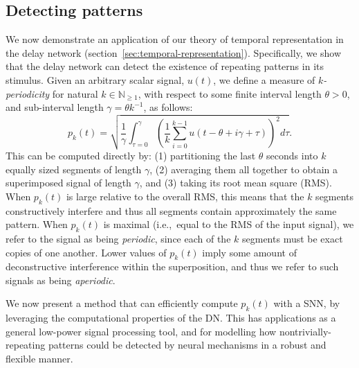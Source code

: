 \subsection{Detecting patterns}
\label{sec:periodicity}

We now demonstrate an application of our theory of temporal representation in the delay network (section~\ref{sec:temporal-representation}).
Specifically, we show that the delay network can detect the existence of repeating patterns in its stimulus.
Given an arbitrary scalar signal, $u(t)$, we define a measure of \emph{$k$-periodicity} for natural $k \in \mathbb{N}_{\ge 1}$, with respect to some finite interval length $\theta > 0$, and sub-interval length $\gamma = \theta k^{-1}$, as follows:
\begin{equation} \label{eq:periodicity}
p_k(t) = \sqrt{ \frac{1}{\gamma} \int_{\tau=0}^{\gamma} \left( \frac{1}{k} \sum_{i=0}^{k-1} u \left( t - \theta + i \gamma + \tau \right) \right)^2 d\tau } \text{.}
\end{equation}
This can be computed directly by: (1) partitioning the last $\theta$ seconds into $k$ equally sized segments of length $\gamma$, (2) averaging them all together to obtain a superimposed signal of length $\gamma$, and (3) taking its root mean square (RMS).
When $p_k(t)$ is large relative to the overall RMS, this means that the $k$ segments constructively interfere and thus all segments contain approximately the same pattern. 
When $p_k(t)$ is maximal (i.e.,~equal to the RMS of the input signal), we refer to the signal  as being \emph{periodic}, since each of the $k$ segments must be exact copies of one another.
Lower values of $p_k(t)$ imply some amount of deconstructive interference within the superposition, and thus we refer to such signals as being \emph{aperiodic}.

We now present a method that can efficiently compute $p_k(t)$ with a SNN, by leveraging the computational properties of the DN.
This has applications as a general low-power signal processing tool, and for modelling how nontrivially-repeating patterns could be detected by neural mechanisms in a robust and flexible manner.

